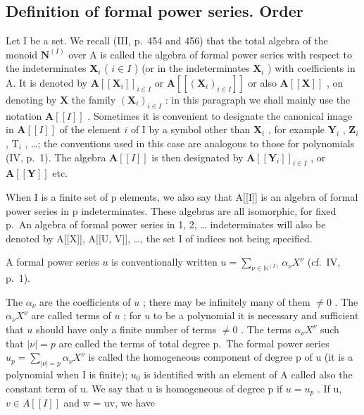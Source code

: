 \subsection{Definition of formal power series. Order}

Let I be a set. We recall (III, p.~454 and 456) that the total algebra of the monoid \(\mathbf{N}^{(I)}\) over A is called the algebra of formal power series with respect to the indeterminates \(\mathbf{X}_i\) ( \(i \in I\) ) (or in the indeterminates \(\mathbf{X}_i\) ) with coefficients in A. It is denoted by \(\mathbf{A}[[\mathbf{X}_i]]_{i \in I}\) or \(\mathbf{A}[[(\mathbf{X}_i)_{i \in I}]]\) or also \(\mathbf{A}[[\mathbf{X}]]\) , on denoting by \(\mathbf{X}\) the family \((\mathbf{X}_i)_{i \in I}\) : in this paragraph we shall mainly use the notation \(\mathbf{A}[[I]]\) . Sometimes it is convenient to designate the canonical image in \(\mathbf{A}[[I]]\) of the element \(i\) of I by a symbol other than \(\mathbf{X}_i\) , for example \(\mathbf{Y}_i\) , \(\mathbf{Z}_i\) , \(\mathrm{T}_i\) , \ldots; the conventions used in this case are analogous to those for polynomials (IV, p.~1). The algebra \(\mathbf{A}[[I]]\) is then designated by \(\mathbf{A}[[\mathbf{Y}_i]]_{i \in I}\) , or \(\mathbf{A}[[\mathbf{Y}]]\) etc.

When I is a finite set of p elements, we also say that A{[}{[}I{]}{]} is an algebra of formal power series in p indeterminates. These algebras are all isomorphic, for fixed p.~An algebra of formal power series in 1, 2, \ldots{} indeterminates will also be denoted by A{[}{[}X{]}{]}, A{[}{[}U, V{]}{]}, \ldots, the set I of indices not being specified.

A formal power series \(u\) is conventionally written \(u = \sum_{\nu \in \mathbb{N}^{(I)}} \alpha_{\nu} X^{\nu}\) (cf.~IV, p.~1).

The \(\alpha_{\nu}\) are the coefficients of \(u\) ; there may be infinitely many of them \(\neq 0\) . The \(\alpha_{\nu}X^{\nu}\) are called terms of \(u\) ; for \(u\) to be a polynomial it is necessary and sufficient that \(u\) should have only a finite number of terms \(\neq 0\) . The terms \(\alpha_{\nu}X^{\nu}\) such that \(|\nu|=p\) are called the terms of total degree p.~The formal power series \(u_{p}=\sum_{|\nu|=p}\alpha_{\nu}X^{\nu}\) is called the homogeneous component of degree p of u (it is a polynomial when I is finite); \(u_{0}\) is identified with an element of A called also the constant term of u. We say that u is homogeneous of degree p if \(u = u_{p}\) . If u, \(v \in A[[I]]\) and w = uv, we have


